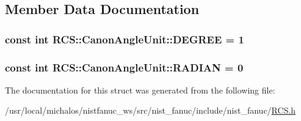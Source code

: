 \subsection{Member Data Documentation}
\hypertarget{structRCS_1_1CanonAngleUnit_a4b3cdd4b5b779ab93d39a83af474556b}{
\subsubsection[{D\-E\-G\-R\-E\-E}]{\setlength{\rightskip}{0pt plus 5cm}const int R\-C\-S\-::\-Canon\-Angle\-Unit\-::\-D\-E\-G\-R\-E\-E = 1\hspace{0.3cm}{\ttfamily [static]}}}\label{structRCS_1_1CanonAngleUnit_a4b3cdd4b5b779ab93d39a83af474556b}
\hypertarget{structRCS_1_1CanonAngleUnit_a2ce063b43cdf08df392c41de9918bb78}{
\subsubsection[{R\-A\-D\-I\-A\-N}]{\setlength{\rightskip}{0pt plus 5cm}const int R\-C\-S\-::\-Canon\-Angle\-Unit\-::\-R\-A\-D\-I\-A\-N = 0\hspace{0.3cm}{\ttfamily [static]}}}\label{structRCS_1_1CanonAngleUnit_a2ce063b43cdf08df392c41de9918bb78}


The documentation for this struct was generated from the following file\-:\begin{DoxyCompactItemize}
\item 
/usr/local/michalos/nistfanuc\-\_\-ws/src/nist\-\_\-fanuc/include/nist\-\_\-fanuc/\hyperlink{RCS_8h}{R\-C\-S.\-h}\end{DoxyCompactItemize}
